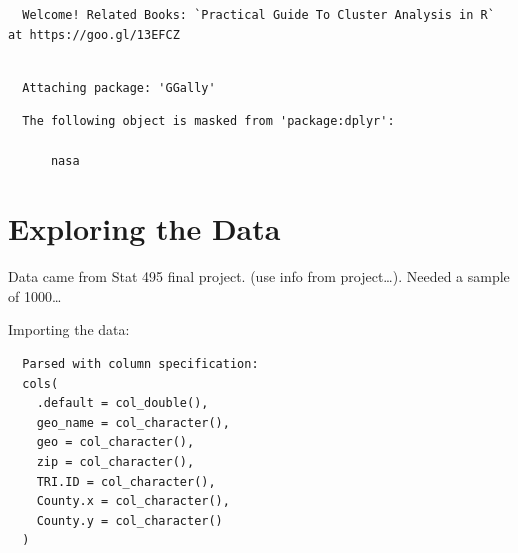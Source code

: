 \documentclass[12pt,twoside]{amherstthesis}
\begin{document}
  \begin{Shaded}
  \begin{Highlighting}[]
  \end{Highlighting}
  \end{Shaded}
  
  \begin{verbatim}
  Welcome! Related Books: `Practical Guide To Cluster Analysis in R` at https://goo.gl/13EFCZ
  \end{verbatim}
  
  \begin{Shaded}
  \begin{Highlighting}[]
  \end{Highlighting}
  \end{Shaded}
  
  \begin{verbatim}
  
  Attaching package: 'GGally'
  \end{verbatim}
  
  \begin{verbatim}
  The following object is masked from 'package:dplyr':
  
      nasa
  \end{verbatim}
  
  \section{Exploring the Data}\label{exploring-the-data}
  
  Data came from Stat 495 final project. (use info from project\ldots{}).
  Needed a sample of 1000\ldots{}
  
  Importing the data:
  
  \begin{Shaded}
  \begin{Highlighting}[]
  \StringTok{ }\NormalTok{(}\NormalTok{)}
  \end{Highlighting}
  \end{Shaded}
  
  \begin{verbatim}
  Parsed with column specification:
  cols(
    .default = col_double(),
    geo_name = col_character(),
    geo = col_character(),
    zip = col_character(),
    TRI.ID = col_character(),
    County.x = col_character(),
    County.y = col_character()
  )
  \end{verbatim}
  
\end{document}
